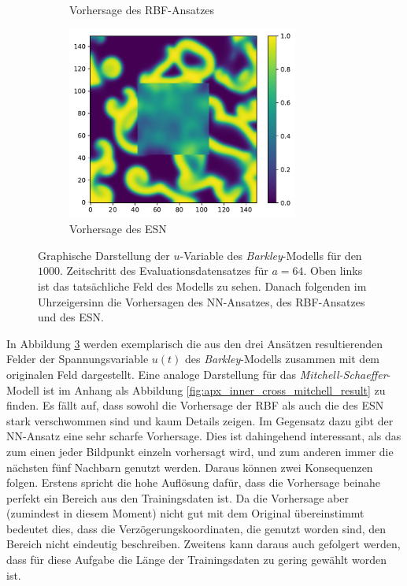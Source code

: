 \begin{figure}[h]
\begin{subfigure}{.5\textwidth}
		\setcapmargin[1cm]{0.5cm}
  		\caption{Vorhersage des \textsc{RBF}-Ansatzes}
  		\label{fig:exp_inner_cross_barkley_result_rbf_pred}
	\end{subfigure}%
	\begin{subfigure}{.5\textwidth}
		\centering
		\includegraphics[height=2.5in]{figures/results/inner_cross_prediction/barkley_u_inner_esn.pdf}
		\setcapmargin[1cm]{0.5cm}
  		\caption{Vorhersage des \textsc{ESN}}
  		\label{fig:exp_inner_cross_barkley_result_esn_pred}
	\end{subfigure}
	\caption{Graphische Darstellung der $u$-Variable des \textit{Barkley}-Modells für den $1000$. Zeitschritt des Evaluationsdatensatzes für $a=64$. Oben links ist das tatsächliche Feld des Modells zu sehen. Danach folgenden im Uhrzeigersinn die Vorhersagen des \textsc{NN}-Ansatzes, des \textsc{RBF}-Ansatzes und des \textsc{ESN}.}
	\label{fig:exp_inner_cross_barkley_result}
\end{figure} 

In Abbildung \ref{fig:exp_inner_cross_barkley_result} werden exemplarisch die aus den drei Ansätzen resultierenden Felder der Spannungsvariable $u(t)$ des \textit{Barkley}-Modells zusammen mit dem originalen Feld dargestellt. Eine analoge Darstellung für das \textit{Mitchell-Schaeffer}-Modell ist im Anhang als Abbildung \ref{fig:apx_inner_cross_mitchell_result} zu finden. Es fällt auf, dass sowohl die Vorhersage der \textsc{RBF} als auch die des \textsc{ESN} stark verschwommen sind und kaum Details zeigen. Im Gegensatz dazu gibt der \textsc{NN}-Ansatz eine sehr scharfe Vorhersage. Dies ist dahingehend interessant, als das zum einen jeder Bildpunkt einzeln vorhersagt wird, und zum anderen immer die nächsten fünf Nachbarn genutzt werden. Daraus können zwei Konsequenzen folgen. Erstens spricht die hohe Auflösung dafür, dass die Vorhersage beinahe perfekt ein Bereich aus den Trainingsdaten ist. Da die Vorhersage aber (zumindest in diesem Moment) nicht gut mit dem Original übereinstimmt bedeutet dies, dass die Verzögerungskoordinaten, die genutzt worden sind, den Bereich nicht eindeutig beschreiben. Zweitens kann daraus auch gefolgert werden, dass für diese Aufgabe die Länge der Trainingsdaten zu gering gewählt worden ist. 
